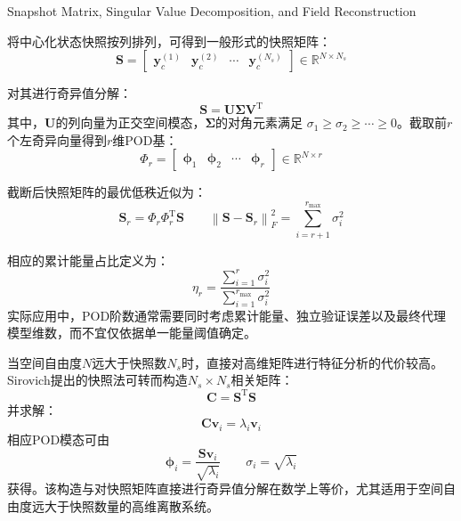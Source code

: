{Snapshot Matrix, Singular Value Decomposition, and Field Reconstruction}
\label{subsec:ch6_pod_svd_theory}

将中心化状态快照按列排列，可得到一般形式的快照矩阵：
\begin{equation}
	\boldsymbol S
	=
	\begin{bmatrix}
		\boldsymbol y_c^{(1)}&
		\boldsymbol y_c^{(2)}&
		\cdots&
		\boldsymbol y_c^{(N_s)}
	\end{bmatrix}
	\in\mathbb R^{N\times N_s}
	\label{eq:ch6_general_snapshot_matrix}
\end{equation}

对其进行奇异值分解：
\begin{equation}
	\boldsymbol S
	=
	\boldsymbol U
	\boldsymbol\Sigma
	\boldsymbol V^{\mathrm T}
	\label{eq:pod_svd_complete}
\end{equation}
其中，$\boldsymbol U$的列向量为正交空间模态，$\boldsymbol\Sigma$的对角元素满足
$\sigma_1\geq\sigma_2\geq\cdots\geq0$。截取前$r$个左奇异向量得到$r$维POD基：
\begin{equation}
	\boldsymbol\varPhi_r
	=
	\begin{bmatrix}
		\boldsymbol\phi_1&
		\boldsymbol\phi_2&
		\cdots&
		\boldsymbol\phi_r
	\end{bmatrix}
	\in\mathbb R^{N\times r}
	\label{eq:pod_basis_complete}
\end{equation}

截断后快照矩阵的最优低秩近似为：
\begin{equation}
	\boldsymbol S_r
	=
	\boldsymbol\varPhi_r
	\boldsymbol\varPhi_r^{\mathrm T}\boldsymbol S
	\qquad
	\left\|\boldsymbol S-\boldsymbol S_r\right\|_F^2
	=
	\sum_{i=r+1}^{r_{\max}}\sigma_i^2
	\label{eq:ch6_pod_truncation_error}
\end{equation}

相应的累计能量占比定义为：
\begin{equation}
	\eta_r
	=
	\frac{\sum_{i=1}^{r}\sigma_i^2}
	{\sum_{i=1}^{r_{\max}}\sigma_i^2}
	\label{eq:pod_energy_complete}
\end{equation}
实际应用中，POD阶数通常需要同时考虑累计能量、独立验证误差以及最终代理模型维数，而不宜仅依据单一能量阈值确定。

当空间自由度$N$远大于快照数$N_s$时，直接对高维矩阵进行特征分析的代价较高。Sirovich提出的快照法可转而构造$N_s\times N_s$相关矩阵\cite{sirovichTurbulenceDynamicsCoherent1987}：
\begin{equation}
	\boldsymbol C
	=
	\boldsymbol S^{\mathrm T}\boldsymbol S
	\label{eq:ch6_snapshot_correlation_matrix}
\end{equation}
并求解：
\begin{equation}
	\boldsymbol C\boldsymbol v_i
	=
	\lambda_i\boldsymbol v_i
	\label{eq:ch6_snapshot_eigenproblem}
\end{equation}
相应POD模态可由
\begin{equation}
	\boldsymbol\phi_i
	=
	\frac{\boldsymbol S\boldsymbol v_i}{\sqrt{\lambda_i}}
	\qquad
	\sigma_i=\sqrt{\lambda_i}
	\label{eq:ch6_snapshot_pod_mode}
\end{equation}
获得。该构造与对快照矩阵直接进行奇异值分解在数学上等价，尤其适用于空间自由度远大于快照数量的高维离散系统\cite{quarteroniReducedBasisMethods2016}。

